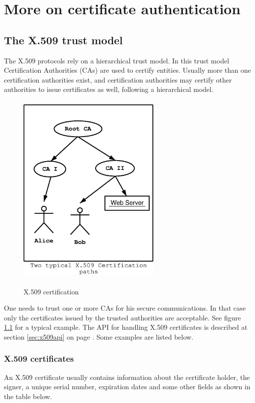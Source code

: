 \chapter{More on certificate authentication}
\label{certificate}

\section{The X.509 trust model}
\label{x509:trust}

The X.509 protocols rely on a hierarchical trust model. In this trust model
Certification Authorities (CAs) are used to certify entities.
Usually more than one certification authorities exist, and certification
authorities may certify other authorities to issue certificates as well,
following a hierarchical model. 

\begin{figure}[tbp]
\caption{X.509 certification}
\includegraphics[height=9.5cm,width=7cm]{x509-1}
\label{fig:x509-1}
\end{figure}

One needs to trust one or more CAs for his secure
communications. In that case only the certificates issued by the trusted
authorities are acceptable. See figure \ref{fig:x509-1} for a typical example.
The API for handling X.509 certificates is described at section \ref{sec:x509api}
on page \pageref{sec:x509api}. Some examples are listed below.



\subsection{X.509 certificates}
An X.509 certificate usually contains information about the certificate
holder, the signer, a unique serial number, expiration dates and some other 
fields \cite{RFC3280} as shown in the table below.

